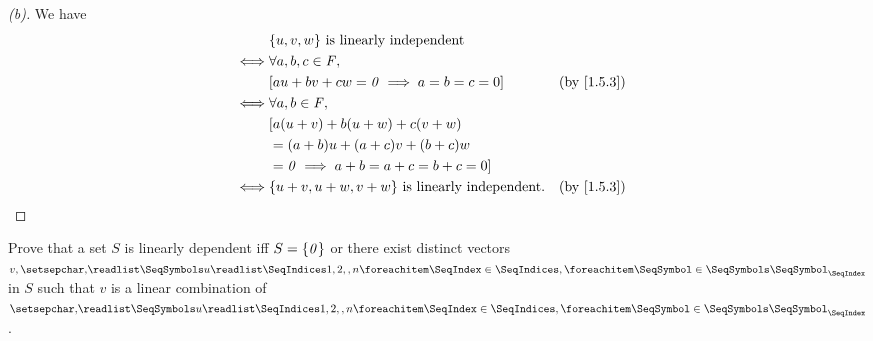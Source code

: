 \begin{proof}[(b)]
	We have
	\begin{align*}
		     & \set{u, v, w} \text{ is linearly independent}                              \\
		\iff & \forall a, b, c \in \F,                                                    \\
		     & [au + bv + cw = \zv \implies a = b = c = 0]                &  & \by{1.5.3} \\
		\iff & \forall a, b \in \F,                                                       \\
		     & [a(u + v) + b(u + w) + c(v + w)                                            \\
		     & = (a + b) u + (a + c) v + (b + c) w                                        \\
		     & = \zv \implies a + b = a + c = b + c = 0]                                  \\
		\iff & \set{u + v, u + w, v + w} \text{ is linearly independent}. &  & \by{1.5.3}
	\end{align*}
\end{proof}

\begin{ex}\label{ex:1.5.14}
	Prove that a set \(S\) is linearly dependent iff \(S = \left\lbrace\mathit{0}\right\rbrace\) or there exist distinct vectors \(v, \seq{u}{1,2,,n}\) in \(S\) such that \(v\) is a linear combination of \(\seq{u}{1,2,,n}\).
\end{ex}

